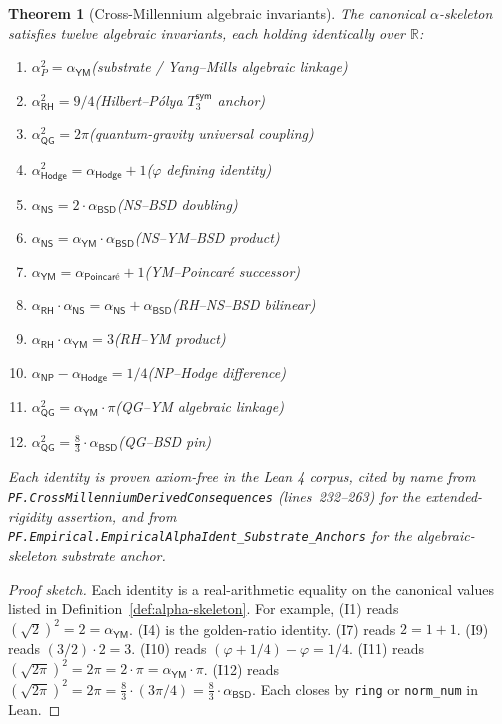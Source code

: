 \documentclass[11pt,a4paper]{amsart}
\theoremstyle{plain}
\newtheorem{theorem}{Theorem}[section]
\theoremstyle{definition}
\begin{document}
\begin{theorem}[Cross-Millennium algebraic invariants]\label{thm:invariants}
The canonical $\alpha$-skeleton satisfies twelve algebraic invariants, each holding identically over $\mathbb{R}$:
\begin{enumerate}[label=(I\arabic*),itemsep=2pt]
\item $\alpha_{P}^2 = \alpha_{\textsf{YM}}$\hfill (substrate / Yang--Mills algebraic linkage)
\item $\alpha_{\textsf{RH}}^2 = 9/4$\hfill (Hilbert--P\'olya $T_3^{\textsf{sym}}$ anchor)
\item $\alpha_{\textsf{QG}}^2 = 2\pi$\hfill (quantum-gravity universal coupling)
\item $\alpha_{\textsf{Hodge}}^2 = \alpha_{\textsf{Hodge}} + 1$\hfill ($\varphi$ defining identity)
\item $\alpha_{\textsf{NS}} = 2\cdot\alpha_{\textsf{BSD}}$\hfill (NS--BSD doubling)
\item $\alpha_{\textsf{NS}} = \alpha_{\textsf{YM}}\cdot\alpha_{\textsf{BSD}}$\hfill (NS--YM--BSD product)
\item $\alpha_{\textsf{YM}} = \alpha_{\textsf{Poincar\'e}} + 1$\hfill (YM--Poincar\'e successor)
\item $\alpha_{\textsf{RH}}\cdot\alpha_{\textsf{NS}} = \alpha_{\textsf{NS}} + \alpha_{\textsf{BSD}}$\hfill (RH--NS--BSD bilinear)
\item $\alpha_{\textsf{RH}}\cdot\alpha_{\textsf{YM}} = 3$\hfill (RH--YM product)
\item $\alpha_{\textsf{NP}} - \alpha_{\textsf{Hodge}} = 1/4$\hfill (NP--Hodge difference)
\item $\alpha_{\textsf{QG}}^2 = \alpha_{\textsf{YM}}\cdot\pi$\hfill (QG--YM algebraic linkage)
\item $\alpha_{\textsf{QG}}^2 = \tfrac{8}{3}\cdot\alpha_{\textsf{BSD}}$\hfill (QG--BSD pin)
\end{enumerate}
Each identity is proven axiom-free in the Lean 4 corpus, cited by name from\\ \texttt{PF.CrossMillenniumDerivedConsequences} (lines~232--263) for the extended-rigidity assertion, and from \texttt{PF.Empirical.EmpiricalAlphaIdent\_Substrate\_Anchors} for the algebraic-skeleton substrate anchor.
\end{theorem}

\begin{proof}[Proof sketch]
Each identity is a real-arithmetic equality on the canonical values listed in Definition~\ref{def:alpha-skeleton}. For example, (I1) reads $(\sqrt{2})^2 = 2 = \alpha_{\textsf{YM}}$. (I4) is the golden-ratio identity. (I7) reads $2 = 1 + 1$. (I9) reads $(3/2)\cdot 2 = 3$. (I10) reads $(\varphi+1/4) - \varphi = 1/4$. (I11) reads $(\sqrt{2\pi})^2 = 2\pi = 2\cdot\pi = \alpha_{\textsf{YM}}\cdot\pi$. (I12) reads $(\sqrt{2\pi})^2 = 2\pi = \tfrac{8}{3}\cdot(3\pi/4) = \tfrac{8}{3}\cdot\alpha_{\textsf{BSD}}$. Each closes by \texttt{ring} or \texttt{norm\_num} in Lean.
\end{proof}
\end{document}
